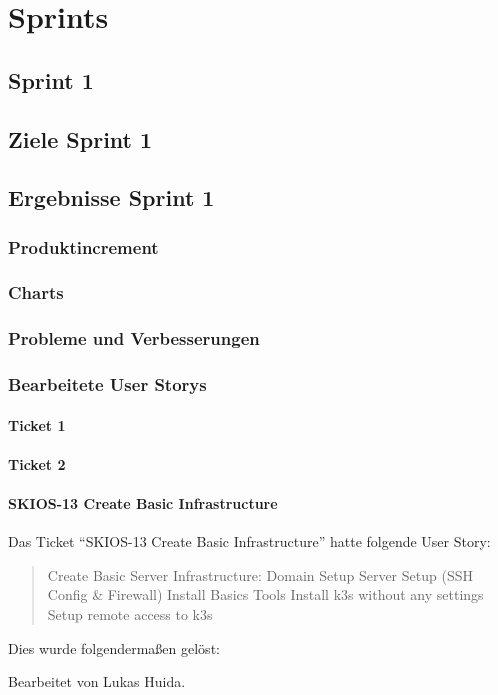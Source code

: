 
\chapter{Sprints}

\section{Sprint 1}

\section{Ziele Sprint 1}

\section{Ergebnisse Sprint 1}

\subsection{Produktincrement}
\subsection{Charts}

\subsection{Probleme und Verbesserungen}


\subsection{Bearbeitete User Storys}

\subsubsection{Ticket 1}

\subsubsection{Ticket 2}

\subsubsection{SKIOS-13 Create Basic Infrastructure}
Das Ticket \enquote{SKIOS-13 Create Basic Infrastructure} hatte folgende User Story:
\begin{quotation}
    Create Basic Server Infrastructure:
    Domain Setup
    Server Setup (SSH Config & Firewall)
    Install Basics Tools
    Install k3s without any settings
    Setup remote access to k3s
\end{quotation}
Dies wurde folgendermaßen gelöst:
\begin{quotation}
    
\end{quotation}
Bearbeitet von Lukas Huida.

